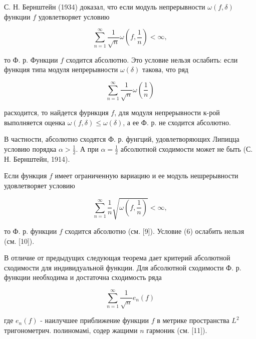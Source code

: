 \documentclass[10pt]{article}
\begin{document}
С. Н. Бернштейн (1934) доказал, что если модуль непрерывности $\omega(f, \delta)$ функции $f$ удовлетворяет условию



\[

\sum_{n=1}^{\infty} \frac{1}{\sqrt{n}} \omega\left(f, \frac{1}{n}\right)<\infty,

\]



то Ф. р. Функции $f$ сходится абсолютно. Это условие нельзя ослабить: если функция типа модуля непрерывности $\omega(\delta)$ такова, что ряд



\[

\sum_{n=1}^{\infty} \frac{1}{\sqrt{n}} \omega\left(\frac{1}{n}\right)

\]



расходится, то найдется фурнкция $f$, для модуля непрерывности к-рой выполняется оценка $\omega(f, \delta) \leqslant \omega(\delta)$, а ее Ф. р. не сходится абсолютно.



В частности, абсолютно сходятся Ф. р. фунгций, удовлетворяющих Липицца условию порядка $\alpha>\frac{1}{2}$. А при $\alpha=\frac{1}{2}$ абсолютной сходимости может не быть (С. Н. Бернштейн, 1914).



Если функция $f$ имеет ограниченную вариацию и ее модуль нешрерывности удовлетворяет условию



\[

\sum_{n=1}^{\infty} \frac{1}{n} \sqrt{\omega\left(f, \frac{1}{n}\right)}<\infty,

\]



то Ф. р. функции $f$ сходится абсолютно (см. [9]). Условие (6) ослабить нельзя (см. [10]).



В отличие от предыдущих следующая теорема дает критерий абсолютной сходимости для индивидуальной функции. Для абсолютной сходимости Ф. р. функции необходима и достаточна сходимость ряда



\[

\sum_{n=1}^{\infty} \frac{1}{\sqrt{n}} e_{n}(f)

\]



где $e_{n}(f)$ - наилучшее приближение функции $f$ в метрике пространства $L^{2}$ тригонометрич. полиномамі, содер жащими $n$ гармоник (см. [11]).
\end{document}
